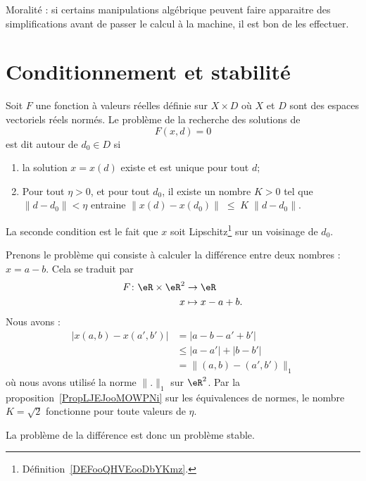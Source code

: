 Moralité : si certains manipulations algébrique peuvent faire apparaitre des simplifications avant de passer le calcul à la machine, il est bon de les effectuer.

\section{Conditionnement et stabilité}

\begin{definition}      \label{DEFooYIFAooSJbMkC}
	Soit $F$ une fonction à valeurs réelles définie sur $X\times D$ où $X$ et $D$ sont des espaces vectoriels réels normés. Le problème de la recherche des solutions de
	\begin{equation}
		F(x,d)=0
	\end{equation}
	est dit  autour de \( d_0\in D\) si
	\begin{enumerate}
		\item
			la solution $x=x(d)$ existe et est unique pour tout $d$;
		\item \label{ItemProbStableB}
			Pour tout $\eta>0$, et pour tout $d_0$, il existe un nombre $K>0$ tel que $\| d-d_0\|<\eta$ entraine $\|x(d)-x(d_0)\|\;\leq\;K\;\|d-d_0\|$.
	\end{enumerate}
    La seconde condition est le fait que \( x\) soit Lipschitz\footnote{Définition~\ref{DEFooQHVEooDbYKmz}.} sur un voisinage de \( d_0\).
\end{definition}

\begin{example}    \label{ExooXJONooTAYZVc}
    Prenons le problème qui consiste à calculer la différence entre deux nombres : \( x=a-b\). Cela se traduit par
    \begin{equation}
        \begin{aligned}
            F\colon \eR\times \eR^2&\to \eR \\
            x&\mapsto x-a+b.
        \end{aligned}
    \end{equation}
    Nous avons :
    \begin{subequations}
        \begin{align}
            \big| x(a,b)-x(a',b') \big|&=| a-b-a'+b' |\\
            &\leq| a-a' |+| b-b' |\\
            &=\|  (a,b)-(a',b')  \|_1
        \end{align}
    \end{subequations}
    où nous avons utilisé la norme \( \| . \|_1\) sur \( \eR^2\). Par la proposition~\ref{PropLJEJooMOWPNi} sur les équivalences de normes, le nombre \( K=\sqrt{2}\) fonctionne pour toute valeurs de \( \eta\).

    La problème de la différence est donc un problème stable.
\end{example}


